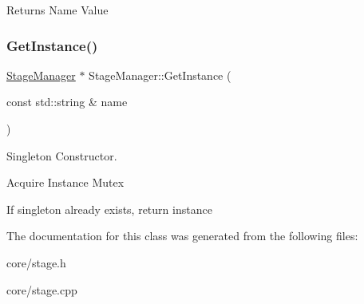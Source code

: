 \begin{DoxyReturn}{Returns}
Name Value 
\end{DoxyReturn}
\mbox{\label{classStageManager_abdafd27d1ae0617c361d400a4d82e2bf}} 
\subsubsection{\texorpdfstring{Get\+Instance()}{GetInstance()}}
{\footnotesize\ttfamily \mbox{\hyperlink{classStageManager}{Stage\+Manager}} $\ast$ Stage\+Manager\+::\+Get\+Instance (\begin{DoxyParamCaption}\item[{const std\+::string \&}]{name }\end{DoxyParamCaption})\hspace{0.3cm}{\ttfamily [static]}}



Singleton Constructor. 

Acquire Instance Mutex

If singleton already exists, return instance 

The documentation for this class was generated from the following files\+:\begin{DoxyCompactItemize}
\item 
core/stage.\+h\item 
core/stage.\+cpp\end{DoxyCompactItemize}
